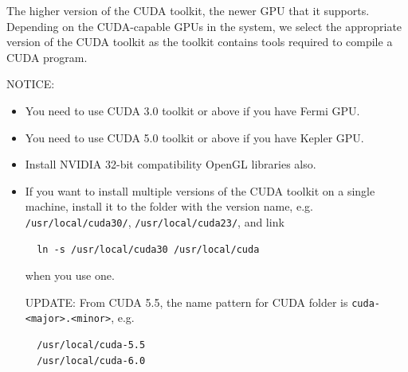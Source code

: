 The higher version of the CUDA toolkit, the newer GPU that it supports.
Depending on the CUDA-capable GPUs in the system, we select the appropriate
version of the CUDA toolkit as the toolkit contains tools required to compile a
CUDA program.


NOTICE:
 \begin{itemize}
 \item You need to use CUDA 3.0 toolkit or above if you have Fermi GPU.
 
 \item You need to use CUDA 5.0 toolkit or above if you have Kepler GPU.
   
 \item Install NVIDIA 32-bit compatibility OpenGL libraries also.

 \item If you want to install multiple versions of the CUDA toolkit on a single
   machine, install it to the folder with the version name,
   e.g. \verb!/usr/local/cuda30/!, \verb!/usr/local/cuda23/!, and link
  \begin{verbatim}
  ln -s /usr/local/cuda30 /usr/local/cuda
  \end{verbatim}
  when you use one.
  
  UPDATE: From CUDA 5.5, the name pattern for CUDA folder is
  \verb!cuda-<major>.<minor>!, e.g.
  \begin{verbatim}
  /usr/local/cuda-5.5
  /usr/local/cuda-6.0
  \end{verbatim}
  
\end{itemize}


